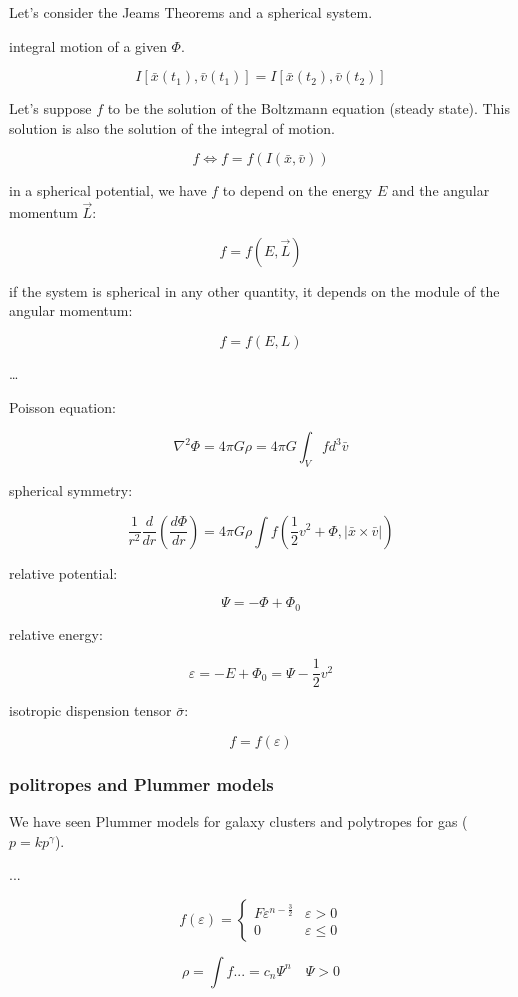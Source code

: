 Let's consider the Jeams Theorems and a spherical system.

integral motion of a given $\Phi$.

$$
I [\bar x (t_1), \bar v (t_1)] = I [\bar x (t_2), \bar v (t_2)]
$$

Let's suppose $f$ to be the solution of the Boltzmann equation (steady state). This solution is also the solution of the integral of motion.

$$
f \iff f = f(I(\bar x, \bar v))
$$

in a spherical potential, we have $f$ to depend on the energy $E$ and the angular momentum $\vec L$:

$$
f = f (E, \vec L)
$$

if the system is spherical in any other quantity, it depends on the module of the angular momentum:

$$
f = f(E, L)
$$

\dots

Poisson equation:

$$
\nabla^2 \Phi = 4 \pi G \rho = 4 \pi G \int_{V} f d^3 \bar v
$$

spherical symmetry:

$$
\dfrac 1{r^2} \dfrac{d}{dr} \left( \dfrac {d \Phi}{dr} \right) = 4 \pi G \rho \int f \left( \dfrac 12 v^2 + \Phi, |\bar x \times \bar v| \right)
$$

relative potential:

$$
\Psi = - \Phi + \Phi_0
$$

relative energy:

$$
\varepsilon =  - E + \Phi_0 = \Psi - \dfrac 12 v^2
$$

isotropic dispension tensor $\bar \sigma$:

$$
f = f(\varepsilon)
$$

\subsubsection{politropes and Plummer models}

We have seen Plummer models for galaxy clusters and polytropes for gas ($p = k p^{\gamma}$).

...

$$
f(\varepsilon) = \begin{cases}
    F \varepsilon^{n - \frac 32} & \varepsilon > 0\\
    0 & \varepsilon \le 0
\end{cases}
$$

$$
\rho = \int f ... = c_n \Psi^n \quad \Psi > 0
$$

